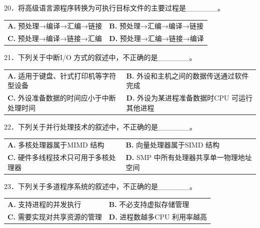 \documentclass[UTF8,11pt]{ctexart}
\begin{document}
20．将高级语言源程序转换为可执行目标文件的主要过程是\_\_\_\_\_\_。


\begin{center}\begin{tabular}{>{\raggedright\arraybackslash}p{\dimexpr(\linewidth-4\tabcolsep)/2\relax}>{\raggedright\arraybackslash}p{\dimexpr(\linewidth-4\tabcolsep)/2\relax}}
\textbf{A.} 预处理→编译→汇编→链接 & \textbf{B.} 预处理→汇编→编译→链接\\[.35em]
\textbf{C.} 预处理→编译→链接→汇编 & \textbf{D.} 预处理→汇编→链接→编译\\[.35em]\end{tabular}\end{center}

21．下列关于中断I/O 方式的叙述中，不正确的是\_\_\_\_\_\_。


\begin{center}\begin{tabular}{>{\raggedright\arraybackslash}p{\dimexpr(\linewidth-4\tabcolsep)/2\relax}>{\raggedright\arraybackslash}p{\dimexpr(\linewidth-4\tabcolsep)/2\relax}}
\textbf{A.} 适用于键盘、针式打印机等字符型设备 & \textbf{B.} 外设和主机之间的数据传送通过软件完成\\[.35em]
\textbf{C.} 外设准备数据的时间应小于中断处理时间 & \textbf{D.} 外设为某进程准备数据时CPU 可运行其他进程\\[.35em]\end{tabular}\end{center}

22．下列关于并行处理技术的叙述中，不正确的是\_\_\_\_\_\_。


\begin{center}\begin{tabular}{>{\raggedright\arraybackslash}p{\dimexpr(\linewidth-4\tabcolsep)/2\relax}>{\raggedright\arraybackslash}p{\dimexpr(\linewidth-4\tabcolsep)/2\relax}}
\textbf{A.} 多核处理器属于MIMD 结构 & \textbf{B.} 向量处理器属于SIMD 结构\\[.35em]
\textbf{C.} 硬件多线程技术只可用于多核处理器 & \textbf{D.} SMP 中所有处理器共享单一物理地址空间\\[.35em]\end{tabular}\end{center}

23．下列关于多道程序系统的叙述中，不正确的是\_\_\_\_\_\_。


\begin{center}\begin{tabular}{>{\raggedright\arraybackslash}p{\dimexpr(\linewidth-4\tabcolsep)/2\relax}>{\raggedright\arraybackslash}p{\dimexpr(\linewidth-4\tabcolsep)/2\relax}}
\textbf{A.} 支持进程的并发执行 & \textbf{B.} 不必支持虚拟存储管理\\[.35em]
\textbf{C.} 需要实现对共享资源的管理 & \textbf{D.} 进程数越多CPU 利用率越高\\[.35em]\end{tabular}\end{center}
\end{document}

